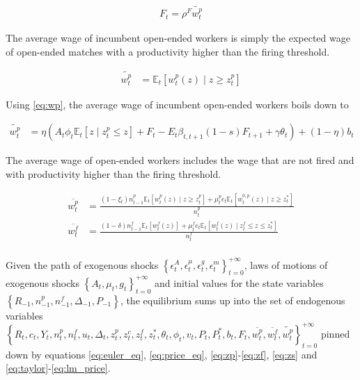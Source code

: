 \begin{align}
F_t = \rho^F \widetilde{w_t^p}
\end{align}

The average wage of incumbent open-ended workers is simply the expected wage of open-ended matches with a productivity higher than the firing threshold.

\begin{align*}
\widetilde{w_t^p} &= \mathbb{E}_t \left[ w_t^p \left( z \right) \mid z \geq z_t^p\right]
\end{align*}

Using \eqref{eq:wp}, the average wage of incumbent open-ended workers boils down to

\begin{align}
\widetilde{w_t^p} &= \eta \left( A_t \phi_t \mathbb{E}_t \left[ z \mid z_t^p \leq z \right] + F_t - E_t \beta_{t,t+1} (1-s) F_{t+1} + \gamma \theta_{t} \right) + (1-\eta) b_t
\end{align}

The average wage of open-ended workers includes the wage that are not fired and with productivity higher than the firing threshold.

\begin{align*}
\overline{w_t^p} &= \frac{\left( 1-\xi_t \right) n_{t-1}^p \mathbb{E}_t \left[ w_t^p \left( z \right) \mid z \geq z_t^p\right] + \mu_t^p e_t \mathbb{E}_t \left[ w_t^{0,p} \left( z \right) \mid z \geq z_t^*\right]}{n_t^p}\\
\overline{w_t^f} &= \frac{\left( 1-\delta \right) n_{t-1}^f\mathbb{E}_t \left[ w_t^f \left( z \right) \right] + \mu_t^f e_t \mathbb{E}_t \left[ w_t^{f} \left( z \right) \mid z_t^f \leq z \leq z_t^*\right]}{n_t^f}\\
\end{align*}

Given the path of exogenous shocks $\left\{ \epsilon_t^A, \epsilon_t^\mu, \epsilon_t^g, \epsilon_t^m \right\}_{t=0}^{+\infty}$, laws of motions of exogenous shocks $\left\{ A_t, \mu_t , g_t \right\}_{t=0}^{+\infty}$ and initial values for the state variables $\left\{ R_{-1}, n_{-1}^p, n_{-1}^f, \Delta_{-1}, P_{-1} \right\}$, the equilibrium sums up into the set of endogenous variables $\left\{ R_t, c_t, Y_t, n_t^p, n_t^f, u_t, \Delta_t, z_t^p, z_t^c, z_t^f, z_t^*, \theta_t, \phi_t, v_t, P_t, P_t^*, b_t, F_t, \overline{w_t^p}, \overline{w_t^f}, \widetilde{w_t^p} \right\}_{t=0}^{+\infty}$ pinned down by equations \eqref{eq:euler_eq}, \eqref{eq:price_eq}, \eqref{eq:zp}-\eqref{eq:zf}, \eqref{eq:zs} and \eqref{eq:taylor}-\eqref{eq:lm_price}. 